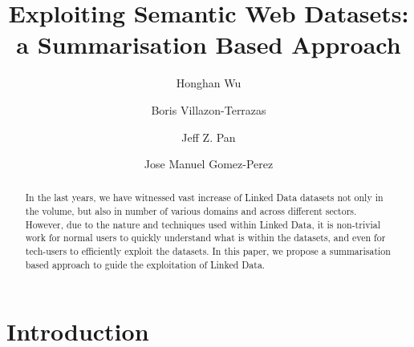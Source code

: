 \documentclass{llncs}
\begin{document}
%
\frontmatter          %
%
\pagestyle{headings}  %
%
%
\mainmatter              %
%
\title{Exploiting Semantic Web Datasets: a Summarisation Based Approach}

%
%
\author{Honghan Wu \and Boris Villazon-Terrazas \and Jeff Z. Pan \and Jose Manuel Gomez-Perez}
%
%
%


\maketitle              %



\begin{abstract}
In the last years, we have witnessed vast increase of Linked Data datasets not only in the volume, but also in number of various domains and across different sectors. However, due to the nature and techniques used within Linked Data, it is non-trivial work for normal users to quickly understand what is within the datasets, and even for tech-users to efficiently exploit the datasets. In this paper, we propose a summarisation based approach to guide the exploitation of Linked Data. 
\end{abstract}

\vspace{-8mm}
\section{Introduction}\label{sec:Introduction}

\vspace{-8mm}
\end{document}
